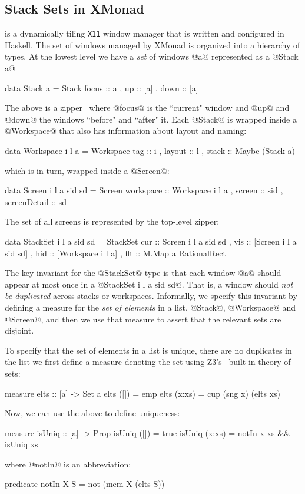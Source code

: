 \subsection{Stack Sets in XMonad}\label{sec:xmonad}

\lbxmonad is a dynamically tiling \texttt{X11} 
window manager that is written and configured in Haskell. 
The set of windows managed by XMonad is organized into a
hierarchy of types. At the lowest level we have a 
\emph{set} of windows @a@ represented as a @Stack a@
%
\begin{code}
  data Stack a = Stack { focus :: a   
                       , up    :: [a] 
                       , down  :: [a] }
\end{code}
%
The above is a zipper~\cite{zipper} where @focus@ is the 
``current" window and @up@ and @down@ the windows ``before"
and ``after" it.
%
Each @Stack@ is wrapped inside a @Workspace@ that also has
information about layout and naming:
%
\begin{code}
  data Workspace i l a = Workspace 
     { tag    :: i
     , layout :: l
     , stack  :: Maybe (Stack a) }
\end{code}
%
which is in turn, wrapped inside a @Screen@:
%
\begin{code}
  data Screen i l a sid sd = Screen 
    { workspace    :: Workspace i l a
    , screen       :: sid
    , screenDetail :: sd }
\end{code}
%
The set of all screens is represented by the top-level zipper:
%
\begin{code}
  data StackSet i l a sid sd = StackSet 
    { cur :: Screen i l a sid sd  
    , vis :: [Screen i l a sid sd]
    , hid :: [Workspace i l a]   
    , flt :: M.Map a RationalRect } 
\end{code}


The key invariant for the @StackSet@ type is that each window @a@
should appear at most once in a @StackSet i l a sid sd@. That is,
a window should \emph{not be duplicated} across stacks or workspaces.
Informally, we specify this invariant by defining a measure for the 
\emph{set of elements} in a list, @Stack@, @Workspace@ and @Screen@,
and then we use that measure to assert that the relevant sets are 
disjoint.

 To specify that the set of elements
in a list is unique, \ie there are no duplicates in the list we first define
a measure denoting the set using Z3's~\citep{z3} built-in theory of sets:
%
\begin{code}
  measure elts  :: [a] -> Set a 
    elts ([])   = emp  
    elts (x:xs) = cup (sng x) (elts xs) 
\end{code}
%
Now, we can use the above to define uniqueness:
%
\begin{code}
  measure isUniq  :: [a] -> Prop 
    isUniq ([])   =  true 
    isUniq (x:xs) =  notIn x xs && isUniq xs
\end{code}
%
where @notIn@ is an abbreviation: 
%
\begin{code}
  predicate notIn X S = not (mem X (elts S))
\end{code}

